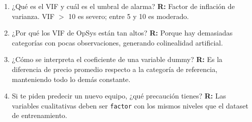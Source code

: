 \documentclass[12pt,a4paper]{article}
\begin{document}
\begin{enumerate}
    \item ¿Qué es el VIF y cuál es el umbral de alarma? \textbf{R:} Factor de inflación de varianza. VIF $>$ 10 es severo; entre 5 y 10 es moderado.
    
    \item ¿Por qué los VIF de OpSys están tan altos? \textbf{R:} Porque hay demasiadas categorías con pocas observaciones, generando colinealidad artificial.
    
    \item ¿Cómo se interpreta el coeficiente de una variable dummy? \textbf{R:} Es la diferencia de precio promedio respecto a la categoría de referencia, manteniendo todo lo demás constante.
    
    \item Si te piden predecir un nuevo equipo, ¿qué precaución tienes? \textbf{R:} Las variables cualitativas deben ser \texttt{factor} con los mismos niveles que el dataset de entrenamiento.
\end{enumerate}

\end{document}
